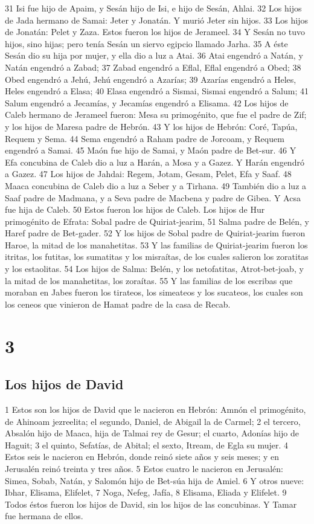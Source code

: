 31 Isi fue hijo de Apaim, y Sesán hijo de Isi, e hijo de Sesán, Ahlai.
32 Los hijos de Jada hermano de Samai: Jeter y Jonatán. Y murió Jeter sin hijos.
33 Los hijos de Jonatán: Pelet y Zaza. Estos fueron los hijos de Jerameel.
34 Y Sesán no tuvo hijos, sino hijas; pero tenía Sesán un siervo egipcio llamado Jarha.
35 A éste Sesán dio su hija por mujer, y ella dio a luz a Atai.
36 Atai engendró a Natán, y Natán engendró a Zabad;
37 Zabad engendró a Eflal, Eflal engendró a Obed;
38 Obed engendró a Jehú, Jehú engendró a Azarías;
39 Azarías engendró a Heles, Heles engendró a Elasa;
40 Elasa engendró a Sismai, Sismai engendró a Salum;
41 Salum engendró a Jecamías, y Jecamías engendró a Elisama.
42 Los hijos de Caleb hermano de Jerameel fueron: Mesa su primogénito, que fue el padre de Zif; y los hijos de Maresa padre de Hebrón.
43 Y los hijos de Hebrón: Coré, Tapúa, Requem y Sema.
44 Sema engendró a Raham padre de Jorcoam, y Requem engendró a Samai.
45 Maón fue hijo de Samai, y Maón padre de Bet-sur.
46 Y Efa concubina de Caleb dio a luz a Harán, a Mosa y a Gazez. Y Harán engendró a Gazez.
47 Los hijos de Jahdai: Regem, Jotam, Gesam, Pelet, Efa y Saaf.
48 Maaca concubina de Caleb dio a luz a Seber y a Tirhana.
49 También dio a luz a Saaf padre de Madmana, y a Seva padre de Macbena y padre de Gibea. Y Acsa fue hija de Caleb.
50 Estos fueron los hijos de Caleb. Los hijos de Hur primogénito de Efrata: Sobal padre de Quiriat-jearim,
51 Salma padre de Belén, y Haref padre de Bet-gader.
52 Y los hijos de Sobal padre de Quiriat-jearim fueron Haroe, la mitad de los manahetitas.
53 Y las familias de Quiriat-jearim fueron los itritas, los futitas, los sumatitas y los misraítas, de los cuales salieron los zoratitas y los estaolitas.
54 Los hijos de Salma: Belén, y los netofatitas, Atrot-bet-joab, y la mitad de los manahetitas, los zoraítas.
55 Y las familias de los escribas que moraban en Jabes fueron los tirateos, los simeateos y los sucateos, los cuales son los ceneos que vinieron de Hamat padre de la casa de Recab.

\chapter{3}

\section*{Los hijos de David}

1 Estos son los hijos de David que le nacieron en Hebrón: Amnón el primogénito, de Ahinoam jezreelita; el segundo, Daniel, de Abigail la de Carmel;
2 el tercero, Absalón hijo de Maaca, hija de Talmai rey de Gesur; el cuarto, Adonías hijo de Haguit;
3 el quinto, Sefatías, de Abital; el sexto, Itream, de Egla su mujer.
4 Estos seis le nacieron en Hebrón, donde reinó siete años y seis meses; y en Jerusalén reinó treinta y tres años. 
5 Estos cuatro le nacieron en Jerusalén: Simea, Sobab, Natán, y Salomón hijo de Bet-súa hija de Amiel.
6 Y otros nueve: Ibhar, Elisama, Elifelet,
7 Noga, Nefeg, Jafía,
8 Elisama, Eliada y Elifelet.
9 Todos éstos fueron los hijos de David, sin los hijos de las concubinas. Y Tamar fue hermana de ellos.


